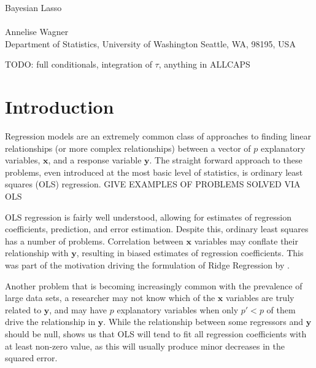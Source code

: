 \documentclass{uwstat572}
\begin{document}

\begin{center}
  {\LARGE Bayesian Lasso}\\\ \\
  {Annelise Wagner \\ 
    Department of Statistics, University of Washington Seattle, WA, 98195, USA
  }
\end{center}

\begin{abstract}
  The Bayesian Lasso, building on the interpretation of Tibshirani, places Laplace priors on linear regression coefficients to allow for Bayesian approaches to parameter and error estimation. Taking advantage of a scale mixture of normals re-expression for the Laplacian distribution allows for easy sampling from full conditionals which in turn culminate in a simple Gibbs sampler.
\end{abstract}

TODO: full conditionals, integration of $\tau$, anything in ALLCAPS

\section{Introduction}\label{Introduction}
Regression models are an extremely common class of approaches to finding linear relationships (or more complex relationships) between a vector of $p$ explanatory variables, $\mathbf{x}$, and a response variable $\mathbf{y}$. The straight forward approach to these problems, even introduced at the most basic level of statistics, is ordinary least squares (OLS) regression. GIVE EXAMPLES OF PROBLEMS SOLVED VIA OLS

OLS regression is fairly well understood, allowing for estimates of regression coefficients, prediction, and error estimation. Despite this, ordinary least squares has a number of problems. Correlation between $\mathbf{x}$ variables may conflate their relationship with $\mathbf{y}$, resulting in biased estimates of regression coefficients. This was part of the motivation driving the formulation of Ridge Regression by \cite{hoerl1970ridge}.

Another problem that is becoming increasingly common with the prevalence of large data sets, a researcher may not know which of the $\mathbf{x}$ variables are truly related to $\mathbf{y}$, and may have $p$ explanatory variables when only $p'<p$ of them drive the relationship in $\mathbf{y}$. While the relationship between some regressors and $\mathbf{y}$ should be null, \cite{seeger2008bayesian} shows us that OLS will tend to fit all regression coefficients with at least non-zero value, as this will usually produce minor decreases in the squared error.
\end{document}
